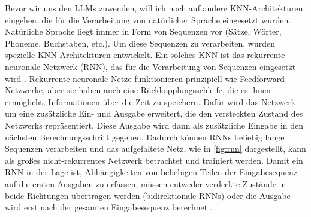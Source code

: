 Bevor wir uns den LLMs zuwenden, will ich noch auf andere KNN-Architekturen eingehen, die für die Verarbeitung von natürlicher Sprache eingesetzt wurden.
Natürliche Sprache liegt immer in Form von Sequenzen vor (Sätze, Wörter, Phoneme, Buchstaben, etc.).
Um diese Sequenzen zu verarbeiten, wurden spezielle KNN-Architekturen entwickelt.
Ein solches KNN ist das rekurrente neuronale Netzwerk (RNN), das für die Verarbeitung von Sequenzen eingesetzt wird \cite{bidirectional_rnn}.
Rekurrente neuronale Netze funktionieren prinzipiell wie Feedforward-Netzwerke, aber sie haben auch eine Rückkopplungsschleife, die es ihnen ermöglicht, Informationen über die Zeit zu speichern.
Dafür wird das Netzwerk um eine zusätzliche Ein- und Ausgabe erweitert, die den versteckten Zustand des Netzwerks repräsentiert.
Diese Ausgabe wird dann als zusätzliche Eingabe in den nächsten Berechnungsschritt gegeben.
Dadurch können RNNs beliebig lange Sequenzen verarbeiten und das \glqq aufgefaltete\grqq{} Netz, wie in \ref{fig:rnn} dargestellt, kann als großes nicht-rekurrentes Netzwerk betrachtet und trainiert werden.
Damit ein RNN in der Lage ist, Abhängigkeiten von beliebigen Teilen der Eingabesequenz auf die ersten Ausgaben zu erfassen, müssen entweder verdeckte Zustände in beide Richtungen übertragen werden (bidirektionale RNNs) oder die Ausgabe wird erst nach der gesamten Eingabesequenz berechnet \cite{bidirectional_rnn}.

